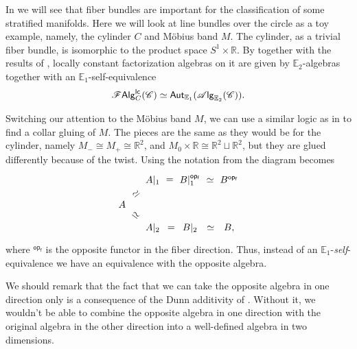 \documentclass[../text]{subfiles}
\begin{document}
\begin{example}\label{ex:cylinder_mobius_band}
    In  we will see that fiber bundles are important for the classification of some stratified manifolds. Here we will look at line bundles over the circle as a toy example, namely, the cylinder $C$ and M\"obius band $M$. The cylinder, as a trivial fiber bundle, is isomorphic to the product space $S^1 \times \mathbb{R}$. By  together with the results of , locally constant factorization algebras on it are given by $\mathbb{E}_2$-algebras together with an $\mathbb{E}_1$-self-equivalence
    \begin{align}
        \mathscr{F} \mathsf{Alg}^{\mathsf{lc}}_C (\mathscr{C}) \simeq \mathsf{Aut}_{\mathbb{E}_1} (\mathscr{A} \mathsf{lg}_{\mathbb{E}_2} (\mathscr{C})).
    \end{align}

    Switching our attention to the M\"obius band $M$, we can use a similar logic as in  to find a collar gluing of $M$. The pieces are the same as they would be for the cylinder, namely $M_- \cong M_+ \cong \mathbb{R}^2$, and $M_0 \times \mathbb{R} \cong \mathbb{R}^2 \sqcup \mathbb{R}^2$, but they are glued differently because of the twist. Using the notation from  the diagram becomes
    \begin{equation}
        \begin{tikzcd}[row sep = small, column sep= small]
            & A|_1 \arrow[r, phantom, "=", description] & B|_1^{\mathsf{op_f}} \arrow[r, phantom, "\simeq", description] & B^{\mathsf{op_f}} \\
            A \arrow[ru, phantom, "\simeq", sloped, description] \arrow[rd, phantom, "\simeq", sloped, description] & & & \\
            & A|_2 \arrow[r, phantom, "=", description] & B|_2 \arrow[r, phantom, "\simeq", description] & B,
        \end{tikzcd}
    \end{equation}
    where $^{\mathsf{op_f}}$ is the opposite functor in the fiber direction. Thus, instead of an $\mathbb{E}_1$-\emph{self}-equivalence we have an equivalence with the opposite algebra.

    We should remark that the fact that we can take the opposite algebra in one direction only is a consequence of the Dunn additivity of . Without it, we wouldn't be able to combine the opposite algebra in one direction with the original algebra in the other direction into a well-defined algebra in two dimensions.
\end{example}
\end{document}
